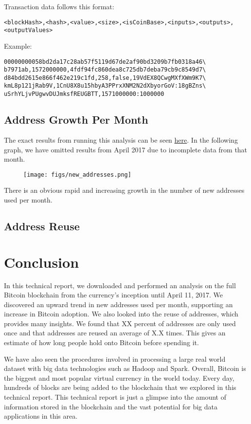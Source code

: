 \documentclass[9pt,twocolumn,twoside]{idsi}
\begin{document}
Transaction data follows this format:
\begin{lstlisting}
<blockHash>,<hash>,<value>,<size>,<isCoinBase>,<inputs>,<outputs>,
<outputValues>
\end{lstlisting}

Example:
\begin{lstlisting}
00000000058bd2da17c28ab57f5119d67de2af90bd3209b7fb0318a46\
b7971ab,1572000000,4fdf94fc860dea8c725db7deba79cb9c8549d7\
d84bdd2615e866f462e219c1fd,258,false,19VdEX8QCwgMXfXWm9K7\
kmL8p121jRab9V,1CnU8X8u15hbyA3PPrxXNM2N2dXbyorGoV:18gBZns\
uSrhYLjvPUgwvDUJmksfREUGBTT,1571000000:1000000
\end{lstlisting}

\subsection{Address Growth Per Month}

The exact results from running this analysis can be seen \href{https://google.com}{here}. In the following graph, we have omitted results from April 2017 due to incomplete data from that month.

\begin{figure}[!ht]
\texttt{[image: figs/new\_addresses.png]}
\end{figure}

There is an obvious rapid and increasing growth in the number of new addresses used per month.

\subsection{Address Reuse}



\section{Conclusion}
In this technical report, we downloaded and performed an analysis on the full Bitcoin blockchain from the currency's inception until April 11, 2017. We discovered an upward trend in new addresses used per month, supporting an increase in Bitcoin adoption. We also looked into the reuse of addresses, which provides many insights. We found that XX percent of addresses are only used once and that addresses are reused an average of X.X times. This gives an estimate of how long people hold onto Bitcoin before spending it.

We have also seen the procedures involved in processing a large real world dataset with big data technologies such as Hadoop and Spark. Overall, Bitcoin is the biggest and most popular virtual currency in the world today. Every day, hundreds of blocks are being added to the blockchain that we explored in this technical report. This technical report is just a glimpse into the amount of information stored in the blockchain and the vast potential for big data applications in this area.
\end{document}
